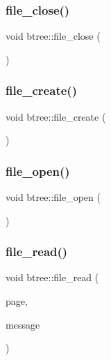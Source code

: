 \mbox{\label{classbtree_a5cf61e38102a281c4368d1621ab10915}} 
\subsubsection{\texorpdfstring{file\+\_\+close()}{file\_close()}}
{\footnotesize\ttfamily void btree\+::file\+\_\+close (\begin{DoxyParamCaption}{ }\end{DoxyParamCaption})}

\mbox{\label{classbtree_a47acf76a2eff403d0367817b10938251}} 
\subsubsection{\texorpdfstring{file\+\_\+create()}{file\_create()}}
{\footnotesize\ttfamily void btree\+::file\+\_\+create (\begin{DoxyParamCaption}{ }\end{DoxyParamCaption})}

\mbox{\label{classbtree_a17544d63a6ebcf6315a500af3d4e3837}} 
\subsubsection{\texorpdfstring{file\+\_\+open()}{file\_open()}}
{\footnotesize\ttfamily void btree\+::file\+\_\+open (\begin{DoxyParamCaption}{ }\end{DoxyParamCaption})}

\mbox{\label{classbtree_ab0b9bbc01c3d3836048934e90aec5f6c}} 
\subsubsection{\texorpdfstring{file\+\_\+read()}{file\_read()}}
{\footnotesize\ttfamily void btree\+::file\+\_\+read (\begin{DoxyParamCaption}\item[{\mbox{\hyperlink{discreta_8h_a433b49570cf2edc4c827e6442bd33998}{Page\+Typ}} $\ast$}]{page,  }\item[{const \mbox{\hyperlink{galois_8h_ab6cc7b4aeb6ea31aba2b3fbfc83ff5e6}{B\+Y\+TE}} $\ast$}]{message }\end{DoxyParamCaption})}


